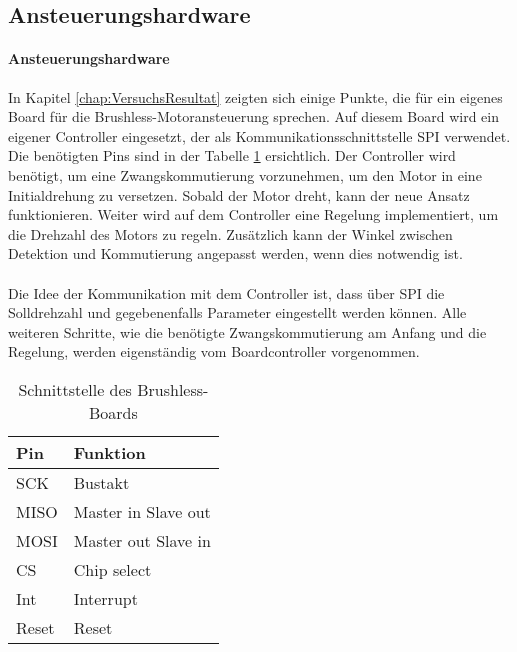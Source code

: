     \subsection{Ansteuerungshardware}
    \fi
    \ifEMBED
    \paragraph{Ansteuerungshardware}$~~$\vspace{2mm}\\
    \fi
        In Kapitel \ref{chap:VersuchsResultat} zeigten sich einige Punkte, die für ein eigenes Board 
        für die Brushless-Motoransteuerung sprechen. Auf diesem Board wird ein eigener Controller 
        eingesetzt, der als Kommunikationsschnittstelle SPI verwendet. Die benötigten Pins sind in 
        der Tabelle \ref{abb:SchnittstelleBrushlessBoard} ersichtlich. Der Controller wird benötigt, 
        um eine Zwangskommutierung vorzunehmen, um den Motor in eine Initialdrehung zu versetzen. 
        Sobald der Motor dreht, kann der neue Ansatz funktionieren. Weiter wird auf dem Controller eine 
        Regelung implementiert, um die Drehzahl des Motors zu regeln. Zusätzlich kann der Winkel 
        zwischen Detektion und Kommutierung angepasst werden, wenn dies notwendig ist.\\
        \\
        Die Idee der Kommunikation mit dem Controller ist, dass über SPI die Solldrehzahl und gegebenenfalls 
        Parameter eingestellt werden können. Alle weiteren Schritte, wie die benötigte Zwangskommutierung am 
        Anfang und die Regelung, werden eigenständig vom Boardcontroller vorgenommen.
        \begin{table}[h!]
            \begin{tabular}{ll}
                Pin     & Funktion \\
            \hline  SCK & Bustakt \\
                MISO    & Master in Slave out \\
                MOSI    & Master out Slave in \\
                CS      & Chip select \\
                Int     & Interrupt \\
                Reset   & Reset \\
            \end{tabular}
           	\centering
           	\caption{Schnittstelle des Brushless-Boards} 
            \label{abb:SchnittstelleBrushlessBoard}
        \end{table}
